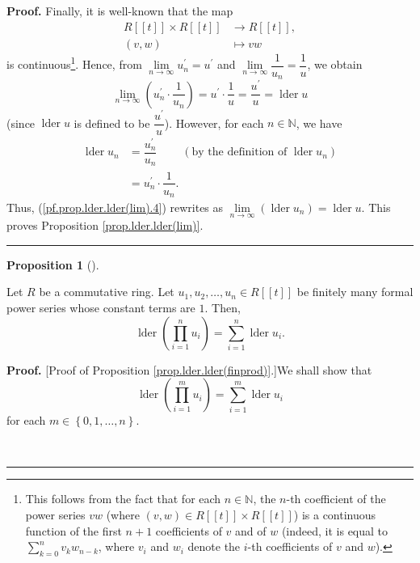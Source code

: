 \documentclass[numbers=enddot,12pt,final,onecolumn,notitlepage]{scrartcl}%
\theoremstyle{definition}
\newtheorem{prop}[theo]{Proposition}
\newenvironment{proposition}[1][]
{\begin{prop}[#1]\begin{leftbar}}
{\end{leftbar}\end{prop}}
\newenvironment{proof}[1][Proof]{\noindent\textbf{#1.} }{\ \rule{0.5em}{0.5em}}
\let\sumnonlimits\sum
\let\prodnonlimits\prod
\renewcommand{\sum}{\sumnonlimits\limits}
\renewcommand{\prod}{\prodnonlimits\limits}
\newenvironment{verlong}{}{}
\begin{document}
\begin{verlong}
\begin{proof}
Finally, it is well-known that the map%
\begin{align*}
R\left[  \left[  t\right]  \right]  \times R\left[  \left[  t\right]  \right]
&  \rightarrow R\left[  \left[  t\right]  \right]  ,\\
\left(  v,w\right)   &  \mapsto vw
\end{align*}
is continuous\footnote{This follows from the fact that for each $n\in
\mathbb{N}$, the $n$-th coefficient of the power series $vw$ (where $\left(
v,w\right)  \in R\left[  \left[  t\right]  \right]  \times R\left[  \left[
t\right]  \right]  $) is a continuous function of the first $n+1$ coefficients
of $v$ and of $w$ (indeed, it is equal to $\sum_{k=0}^{n}v_{k}w_{n-k}$, where
$v_{i}$ and $w_{i}$ denote the $i$-th coefficients of $v$ and $w$).}. Hence,
from $\lim\limits_{n\rightarrow\infty}u_{n}^{\prime}=u^{\prime}$ and
$\lim\limits_{n\rightarrow\infty}\dfrac{1}{u_{n}}=\dfrac{1}{u}$, we obtain%
\begin{equation}
\lim\limits_{n\rightarrow\infty}\left(  u_{n}^{\prime}\cdot\dfrac{1}{u_{n}%
}\right)  =u^{\prime}\cdot\dfrac{1}{u}=\dfrac{u^{\prime}}{u}%
=\operatorname*{lder}u \label{pf.prop.lder.lder(lim).4}%
\end{equation}
(since $\operatorname*{lder}u$ is defined to be $\dfrac{u^{\prime}}{u}$).
However, for each $n\in\mathbb{N}$, we have%
\begin{align*}
\operatorname*{lder}u_{n}  &  =\dfrac{u_{n}^{\prime}}{u_{n}}%
\ \ \ \ \ \ \ \ \ \ \left(  \text{by the definition of }\operatorname*{lder}%
u_{n}\right) \\
&  =u_{n}^{\prime}\cdot\dfrac{1}{u_{n}}.
\end{align*}
Thus, (\ref{pf.prop.lder.lder(lim).4}) rewrites as $\lim\limits_{n\rightarrow
\infty}\left(  \operatorname*{lder}u_{n}\right)  =\operatorname*{lder}u$. This
proves Proposition \ref{prop.lder.lder(lim)}.
\end{proof}

\begin{proposition}
\label{prop.lder.lder(finprod)}Let $R$ be a commutative ring. Let $u_{1}%
,u_{2},\ldots,u_{n}\in R\left[  \left[  t\right]  \right]  $ be finitely many
formal power series whose constant terms are $1$. Then,%
\[
\operatorname*{lder}\left(  \prod_{i=1}^{n}u_{i}\right)  =\sum_{i=1}%
^{n}\operatorname*{lder}u_{i}.
\]

\end{proposition}

\begin{proof}
[Proof of Proposition \ref{prop.lder.lder(finprod)}.]We shall show that%
\begin{equation}
\operatorname*{lder}\left(  \prod_{i=1}^{m}u_{i}\right)  =\sum_{i=1}%
^{m}\operatorname*{lder}u_{i} \label{pf.prop.lder.lder(finprod).claim}%
\end{equation}
for each $m\in\left\{  0,1,\ldots,n\right\}  $.


\end{proof}
\end{verlong}
\end{document}
